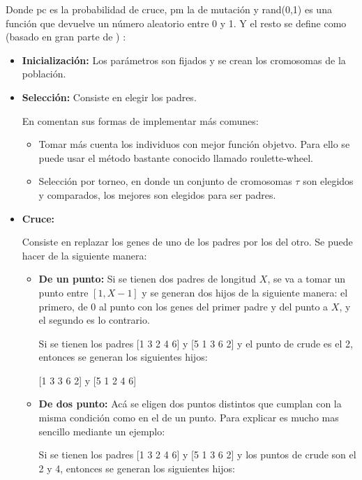 Donde pc es la probabilidad de cruce, pm la de mutaci\'on y rand(0,1)
es una funci\'on que devuelve un n\'umero aleatorio entre 0 y 1. Y el resto
se define como (basado en gran parte de \cite{GePo2010}) :

\begin{itemize}

\item {\bf Inicializaci\'on:} Los par\'ametros son fijados y se
crean los cromosomas de la poblaci\'on.

\item {\bf Selecci\'on:} Consiste en elegir los padres. 

En comentan sus formas de implementar m\'as comunes:

\begin{itemize}

\item Tomar m\'as cuenta los individuos
con mejor funci\'on objetvo. Para ello se puede usar el m\'etodo bastante conocido
llamado roulette-wheel. 

\item Selecci\'on por torneo, en
donde un conjunto de cromosomas $\tau$ son elegidos y comparados, los mejores
son elegidos para ser padres. 

\end{itemize}

\item {\bf Cruce:}

Consiste en replazar los genes de uno de los padres por los del otro. Se puede hacer
de la siguiente manera:

\begin{itemize}

\item {\bf De un punto:} Si se tienen dos padres de longitud $X$, se va a tomar
un punto entre $[1,X-1]$ y se generan dos hijos de la siguiente manera: el primero,
de 0 al punto con los genes del primer padre y del punto a $X$, y el segundo es 
lo contrario.

Si se tienen los padres [1 3 2 4 6]  y [5 1 3 6 2] y el punto 
de crude es el 2, entonces se generan los siguientes hijos:

[1 3 3 6 2] y [5 1 2 4 6]

\item {\bf De dos punto:} Ac\'a se eligen dos puntos distintos que cumplan con la 
misma condici\'on como en el de un punto. Para explicar es mucho mas sencillo
mediante un ejemplo:

Si se tienen los padres [1 3 2 4 6]  y [5 1 3 6 2] y los puntos 
de crude son el 2 y 4, entonces se generan los siguientes hijos:


\end{itemize}
\end{itemize}
